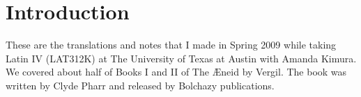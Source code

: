 \chapter{Introduction}

These are the translations and notes that I made in Spring 2009 while taking Latin IV (LAT312K) at
The University of Texas at Austin with Amanda Kimura.  We covered about half of Books I and II of 
The {\AE}neid by Vergil.  The book was written by Clyde Pharr and released by Bolchazy publications.